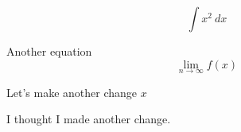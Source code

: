 \documentclass[11pt]{article}
\begin{document}
$$ \int x^2 \ dx $$

Another equation
$$\lim_{n\to\infty}f(x)$$

Let's make another change $x$

I thought I made another change. 
\end{document}
